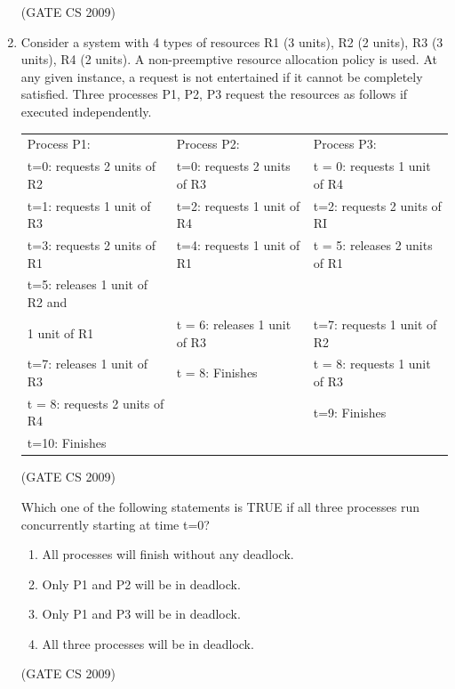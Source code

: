 \documentclass[a4paper, 11pt]{article}
\begin{document}
\begin{enumerate}
    \hfill (GATE CS 2009)

    \item Consider a system with 4 types of resources R1 (3 units), R2 (2 units), R3 (3 units), R4 (2 units). A non-preemptive resource allocation policy is used. At any given instance, a request is not entertained if it cannot be completely satisfied. Three processes P1, P2, P3 request the resources as follows if executed independently.\\
    \begin{tabular}{|l|l|l|}
    \hline
        Process P1: & Process P2: & Process P3: \\
        t=0: requests 2 units of R2 & t=0: requests 2 units of R3 & t = 0: requests 1 unit of R4 \\
        t=1: requests 1 unit of R3 & t=2: requests 1 unit of R4 & t=2: requests 2 units of RI \\
        t=3: requests 2 units of R1 & t=4: requests 1 unit of R1 & t = 5: releases 2 units of R1 \\
        t=5: releases 1 unit of R2 and\\ 1 unit of R1 & t = 6: releases 1 unit of R3 & t=7: requests 1 unit of R2 \\
        t=7: releases 1 unit of R3 & t = 8: Finishes & t = 8: requests 1 unit of R3 \\
        t = 8: requests 2 units of R4 &  &  t=9: Finishes \\
        t=10: Finishes &  & \\
        \hline
    \end{tabular}

    \hfill (GATE CS 2009)

    Which one of the following statements is TRUE if all three processes run concurrently starting at time t=0?
    \begin{enumerate} 
        \item All processes will finish without any deadlock.
        \item Only P1 and P2 will be in deadlock.
        \item Only P1 and P3 will be in deadlock.
        \item All three processes will be in deadlock.
    \end{enumerate}

    \hfill (GATE CS 2009)


\end{enumerate}
\end{document}
